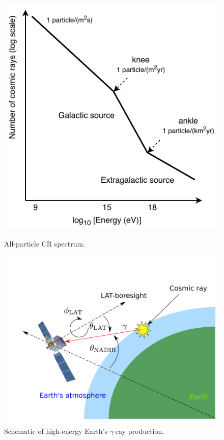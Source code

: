 \begin{figure}[h]
    \begin{minipage}{0.45\textwidth}
        \includegraphics[width=\textwidth]{img/CRs_overview}
        \caption{All-particle CR spectrum.}
        \label{cr_knee_ankle}
    \end{minipage}\hspace{2pc}
    \begin{minipage}{0.55\textwidth}
        \includegraphics[width=\textwidth]{img/gamma_production_schematic}
        \caption{Schematic of high-energy Earth's $\gamma$-ray production.}
        \label{gamma_production_schematic}
    \end{minipage} 
\end{figure}

